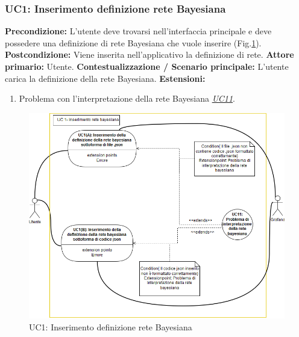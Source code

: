 				\subsubsection{UC1: Inserimento definizione rete Bayesiana}
                    \textbf{Precondizione:} L’utente deve trovarsi nell'interfaccia principale e deve possedere una definizione di rete Bayesiana che vuole inserire (Fig.\ref{uc1}).
                    \newline
                    \textbf{Postcondizione:} Viene inserita nell'applicativo la definizione di rete.
                    \newline
                    \textbf{Attore primario:} Utente.
                    \newline
                    \textbf{Contestualizzazione / Scenario principale:} L’utente carica la definizione della rete Bayesiana.
                    \newline
                    \textbf{Estensioni:} 
                    	\begin{enumerate}
                            \item Problema con l’interpretazione della rete Bayesiana \underline{\textit{UC11}}.
                        \end{enumerate}
                        
                    \begin{figure}[!htbp]
                    	\centering
                    	\includegraphics[scale=0.55]{UC1.png}
                    	\caption{UC1: Inserimento definizione rete Bayesiana}
                    	\label{uc1}
                    \end{figure}
                    \clearpage
                
